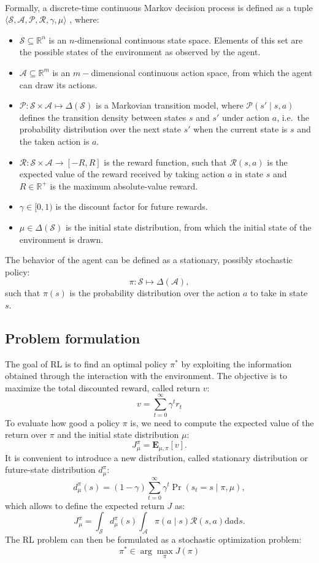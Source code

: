 \paragraph{} %
Formally, a discrete-time continuous Markov decision process is defined as a tuple
$\langle \mathcal{S},\mathcal{A},\mathcal{P},\mathcal{R},\gamma,\mu \rangle$
, where:
\begin{itemize}
\item $\mathcal{S} \subseteq \mathbb{R}^n$ is an $n$-dimensional continuous state space. Elements of this set are the possible states of the environment as observed by the agent.
\item $\mathcal{A}\subseteq \mathbb{R}^m$ is an $m-$dimensional continuous action space, from which the agent can draw its actions.
\item  $\mathcal{P} \colon \mathcal{S}\times\mathcal{A} \mapsto \Delta(\mathcal{S}) $ is a Markovian transition model, where $\mathcal{P}(s'\mid s,a)$ defines the transition density between states $s$ and $s'$ under action $a$, i.e.\ the probability distribution over the next state $s'$ when the current state is $s$ and the taken action is $a$.
\item $\mathcal{R}:\mathcal{S} \times \mathcal{A} \rightarrow [-R,R]$ is the reward function, such that $\mathcal{R}(s,a)$ is the expected value of the reward received by taking action $a$ in state $s$ and $R \in \mathbb{R^+}$ is the maximum absolute-value reward.
\item $\gamma \in [0,1)$ is the discount factor for future rewards.
\item $\mu \in \Delta(\mathcal{S})$ is the initial state distribution, from which the initial state of the environment is drawn.
\end{itemize}
The behavior of the agent can be defined as a stationary, possibly stochastic policy:
 \[
 	\pi \colon \mathcal{S}\mapsto\Delta(\mathcal{A}),
 \] 
 such that $\pi(s)$ is the probability distribution over the action $a$ to take in state $s$. 

\subsection{Problem formulation}
The goal of \ac{RL} is to find an optimal policy $\pi^*$ by exploiting the information obtained through the interaction with the environment. The objective is to maximize the total discounted reward, called return $v$:
\[
	v = \sum_{t=0}^{\infty}\gamma^tr_{t}
\]
To evaluate how good a policy $\pi$ is, we need to compute the expected value of the return over $\pi$ and the initial state distribution $\mu$:
\[
	J_\mu^\pi = \mathbf{E}_{\mu,\pi}[v].
\]
It is convenient to introduce a new distribution, called stationary distribution or future-state distribution $d_{\mu}^{\pi}$:
\[
	d_{\mu}^{\pi}(s) = (1-\gamma)\sum_{t=0}^{\infty}\gamma^t\Pr(s_t=s\mid\pi,\mu),
\] 
which allows to define the expected return $J$ as:
\[
	J_\mu^\pi = \int_{\mathcal{S}}d_{\mu}^{\pi}(s)\int_{\mathcal{A}}\pi(a \mid s)\mathcal{R}(s,a)\mathrm{d}a\mathrm{d}s.
\]
The \ac{RL} problem can then be formulated as a stochastic optimization problem:
\[
	\pi^* \in \arg\max\limits_{\pi}J(\pi)
\]

